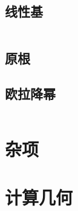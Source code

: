 \documentclass[a4paper,11pt]{article}
\begin{document}
\subsection{线性基}
\inputminted[breaklines]{c++}{Math/线性基.cpp}

\subsection{原根}


\subsection{欧拉降幂}
\inputminted[breaklines]{c++}{Math/欧拉降幂.cpp}



\newpage
\section{杂项}


















\newpage
\section{计算几何}







\end{document}
